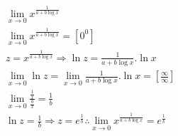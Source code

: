 \begin{ex}
\begin{align}
&\lim_{x\rightarrow 0} x^{\frac{1}{a+b\log{x}}}\nonumber\\
&\lim_{x\rightarrow 0} x^{\frac{1}{a+b\log{x}}}=[0^0]\nonumber\\
&z=x^{\frac{1}{a+b\log{x}}} \Rightarrow \ln{z}=\frac{1}{a+b\log{x}}.\ln{x}\nonumber\\
&\lim_{x\rightarrow 0} \ln{z}=\lim_{x\rightarrow 0} \frac{1}{a+b\log{x}}.\ln{x}=\left[\frac{\infty}{\infty}\right]\nonumber\\
&\lim_{x\rightarrow 0} \frac{\frac{1}{x}}{\frac{b}{x}}=\frac{1}{b}\nonumber\\
&\ln{z}=\frac{1}{b} \Rightarrow z= e^{\frac{1}{b}} \therefore \lim_{x\rightarrow 0} x^{\frac{1}{a+b\log{x}}}=e^{\frac{1}{b}}\nonumber
\end{align}
\end{ex}